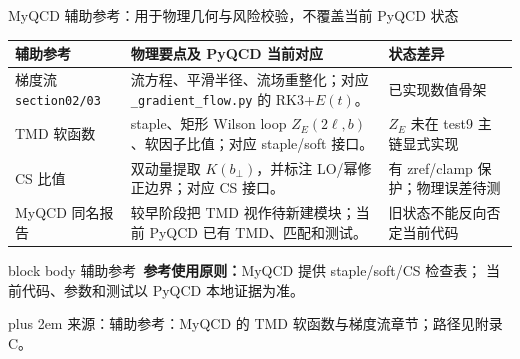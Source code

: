 \documentclass[UTF8,aspectratio=169,11pt]{ctexbeamer}
\renewcommand{\arraystretch}{0.92}
\newcommand{\source}[1]{%
  \par\vspace{0.02em}\begingroup\fontsize{6}{6.8}\selectfont\raggedright\sloppy
  \setlength{\emergencystretch}{3em}\rightskip=0pt plus 2em
  \color{muted}来源：#1\par\endgroup}
\newcommand{\refstate}{\textcolor{reference}{辅助参考}}
\begin{document}
\begin{frame}[t]{MyQCD 辅助参考：用于物理几何与风险校验，不覆盖当前 PyQCD 状态}
  \footnotesize
  \renewcommand{\arraystretch}{0.82}
  \begin{tabularx}{0.98\textwidth}{@{}p{}Yp{0.23\textwidth}@{}}
    \toprule
    辅助参考 & 物理要点及 PyQCD 当前对应 & 状态差异\\
    \midrule
    梯度流 \nolinkurl{section02/03} & 流方程、平滑半径、流场重整化；对应 \nolinkurl{_gradient_flow.py} 的 RK3+\(E(t)\)。 & 已实现数值骨架\\
    TMD 软函数 & staple、矩形 Wilson loop \(Z_E(2\ell,b)\)、软因子比值；对应 staple/soft 接口。 & \(Z_E\) 未在 test9 主链显式实现\\
    CS 比值 & 双动量提取 \(K(b_\perp)\)，并标注 LO/幂修正边界；对应 CS 接口。 & 有 zref/clamp 保护；物理误差待测\\
    MyQCD 同名报告 & 较早阶段把 TMD 视作待新建模块；当前 PyQCD 已有 TMD、匹配和测试。 & 旧状态不能反向否定当前代码\\
    \bottomrule
  \end{tabularx}
  \vspace{0.1em}
  \begin{beamercolorbox}[wd=0.98\textwidth,sep=0.22em,rounded=true]{block body}
    \scriptsize\refstate\ \textbf{参考使用原则：}MyQCD 提供 staple/soft/CS 检查表；
    当前代码、参数和测试以 PyQCD 本地证据为准。
  \end{beamercolorbox}
  \source{辅助参考：MyQCD 的 TMD 软函数与梯度流章节；路径见附录 C。}
\end{frame}
\end{document}
